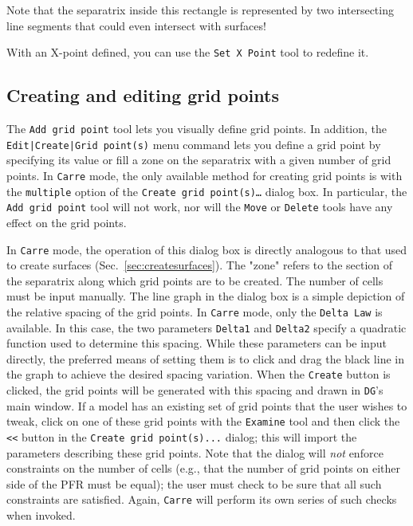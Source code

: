\documentclass[a4paper,10pt]{report}
\begin{document}
Note that the separatrix inside this rectangle is represented by two
intersecting line segments that could even intersect with surfaces!

With an X-point defined, you can use the {\tt Set X Point} tool to
redefine it.

\subsection{Creating and editing grid points}

The {\tt Add grid point} tool lets you visually define grid points.
In addition, the {\tt Edit|Create|Grid point(s)} menu command lets you
define a grid point by specifying its value or fill a zone on the
separatrix with a given number of grid points.
In {\tt Carre} mode, the only available method for creating grid points
is with the {\tt multiple} option of the
{\tt Create grid point(s)\ldots}
dialog box.  In particular, the {\tt Add grid point} tool
will not work, nor will the {\tt Move} or
{\tt Delete} tools have any
effect on the grid points.

In {\tt Carre} mode, the operation of this dialog box is directly
analogous to that used to create surfaces (Sec.~\ref{sec:createsurfaces}).
The "zone" refers to the section of the separatrix along which
grid points are to be created.
The number of cells must be input manually.  The line graph in the dialog box is a
simple depiction of the relative spacing of the grid points.  In {\tt Carre} mode,
only the {\tt Delta Law} is available.  In this case, the two parameters
{\tt Delta1} and {\tt Delta2} specify a quadratic function used to determine
this spacing.  While these parameters can be input directly, the preferred
means of setting them is to click and drag the black line in the graph to
achieve the desired spacing variation.  When the {\tt Create} button is
clicked, the grid points will be generated with this spacing and drawn in
{\tt DG}'s main window.  If a model has an existing set of grid points that the
user wishes to tweak, click on one
of these grid points with the {\tt Examine} tool and then
click the {\tt <<} button in the {\tt Create grid point(s)...}
dialog; this will
import the parameters describing these grid points.
Note that the dialog will {\em not} enforce constraints on the number of
cells (e.g., that the number of grid points on either side of the
PFR must be equal); the
user must check to be sure that all such constraints are satisfied.
Again, {\tt Carre} will perform its own series of such checks when invoked.
\end{document}
